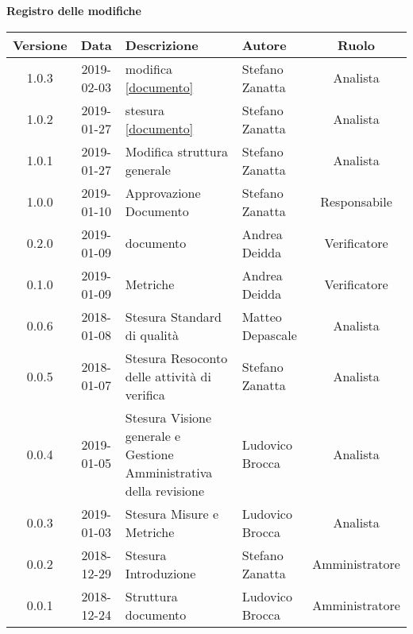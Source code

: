 	\begin{center}
		\textbf{Registro delle modifiche}
	\end{center}
	\begin{center}
		\begin{tabularx}{\textwidth}{|c|c|X|X|c|}
			\hline
			\textbf{Versione} & \textbf{Data} & \textbf{Descrizione} & \textbf{Autore} & \textbf{Ruolo} \\
			\hline
			1.0.3 & 2019-02-03 & modifica \ref{documento}& Stefano Zanatta & Analista\\
			\hline
			1.0.2 & 2019-01-27 & stesura \ref{documento}& Stefano Zanatta & Analista\\
			\hline
			1.0.1 & 2019-01-27 & Modifica struttura generale& Stefano Zanatta & Analista\\
			\hline
			1.0.0 & 2019-01-10 & Approvazione Documento& Stefano Zanatta & Responsabile\\
			\hline
			0.2.0 & 2019-01-09 & \glossario{Verifica} documento & Andrea Deidda & Verificatore\\
			\hline
			0.1.0 & 2019-01-09 & \glossario{Verifica} Metriche & Andrea Deidda & Verificatore\\
			\hline
			0.0.6 & 2018-01-08 & Stesura Standard di qualità & Matteo Depascale & Analista\\
			\hline
			0.0.5 & 2018-01-07 & Stesura Resoconto delle attività di verifica & Stefano Zanatta & Analista\\
			\hline
			0.0.4 & 2019-01-05 & Stesura Visione generale e Gestione Amministrativa della revisione  & Ludovico Brocca& Analista\\
			\hline	
			0.0.3 & 2019-01-03& Stesura Misure e Metriche &Ludovico Brocca & Analista\\
			\hline
			0.0.2 & 2018-12-29 & Stesura Introduzione & Stefano Zanatta & Amministratore\\
			\hline
			0.0.1 & 2018-12-24 & Struttura documento & Ludovico Brocca & Amministratore\\
			\hline
		\end{tabularx}
	\end{center}
\newpage